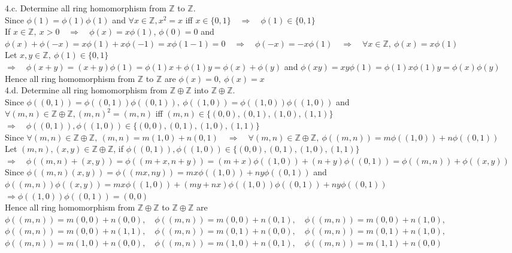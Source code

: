 \documentclass[12pt]{book}
\begin{document}
\begin{CJK}{UTF8}{bsmi}
4.c. Determine all ring homomorphism from $\mathbb{Z}$ to $\mathbb{Z}$. \\
Since $\phi(1)=\phi(1)\phi(1)$ and $\forall x\in\mathbb{Z}, x^2=x$ iff $x\in\{0, 1\}\quad\Rightarrow\quad\phi(1)\in\{0, 1\}$ \\
If $x\in\mathbb{Z},\ x>0\quad\Rightarrow\quad\phi(x)=x\phi(1)$, $\phi(0)=0$ and \\
$\phi(x)+\phi(-x)=x\phi(1)+x\phi(-1)=x\phi(1-1)=0\quad\Rightarrow\quad\phi(-x)=-x\phi(1)\quad\Rightarrow\quad\forall x\in\mathbb{Z},\ \phi(x)=x\phi(1)$ \\
Let $x, y\in\mathbb{Z},\ \phi(1)\in\{0, 1\}$ \\
$\Rightarrow\quad\phi(x+y)=(x+y)\phi(1)=\phi(1)x+\phi(1)y=\phi(x)+\phi(y)$ and $\phi(xy)=xy\phi(1)=\phi(1)x\phi(1)y=\phi(x)\phi(y)$ \\
Hence all ring homomorphism from $\mathbb{Z}$ to $\mathbb{Z}$ are $\phi(x)=0,\ \phi(x)=x$ \\

4.d. Determine all ring homomorphism from $\mathbb{Z}\oplus\mathbb{Z}$ into $\mathbb{Z}\oplus\mathbb{Z}$. \\
Since $\phi((0, 1))=\phi((0, 1))\phi((0, 1)),\ \phi((1, 0))=\phi((1, 0))\phi((1, 0))$ and \\
$\forall (m, n)\in\mathbb{Z}\oplus\mathbb{Z}, (m, n)^2=(m, n)$ iff $(m, n)\in\{(0, 0), (0, 1), (1, 0), (1, 1)\}$ \\
$\Rightarrow\quad\phi((0, 1)), \phi((1, 0))\in\{(0, 0), (0, 1), (1, 0), (1, 1)\}$ \\
Since $\forall (m, n)\in\mathbb{Z}\oplus\mathbb{Z},\ (m, n)=m(1, 0)+n(0, 1)\quad\Rightarrow\quad\forall (m, n)\in\mathbb{Z}\oplus\mathbb{Z},\ \phi((m, n))=m\phi((1, 0))+n\phi((0, 1))$ \\
Let $(m, n), (x, y)\in\mathbb{Z}\oplus\mathbb{Z}$, if $\phi((0, 1)), \phi((1, 0))\in\{(0, 0), (0, 1), (1, 0), (1, 1)\}$ \\
$\Rightarrow\quad\phi((m, n)+(x, y))=\phi((m+x, n+y))=(m+x)\phi((1, 0))+(n+y)\phi((0, 1))=\phi((m, n))+\phi((x, y))$ \\
Since $\phi((m, n)(x, y))=\phi((mx, ny))=mx\phi((1, 0))+ny\phi((0, 1))$ and \\
$\phi((m, n))\phi((x, y))=mx\phi((1, 0))+(my+nx)\phi((1, 0))\phi((0, 1))+ny\phi((0, 1))$ \\
$\Rightarrow\phi((1, 0))\phi((0, 1))=(0, 0)$ \\
Hence all ring homomorphism from $\mathbb{Z}\oplus\mathbb{Z}$ to $\mathbb{Z}\oplus\mathbb{Z}$ are \\
$\phi((m, n))=m(0, 0)+n(0, 0),\quad\phi((m, n))=m(0, 0)+n(0, 1),\quad\phi((m, n))=m(0, 0)+n(1, 0),$ \\
$\phi((m, n))=m(0, 0)+n(1, 1),\quad\phi((m, n))=m(0, 1)+n(0, 0),\quad\phi((m, n))=m(0, 1)+n(1, 0),$ \\
$\phi((m, n))=m(1, 0)+n(0, 0),\quad\phi((m, n))=m(1, 0)+n(0, 1),\quad\phi((m, n))=m(1, 1)+n(0, 0)$ \\


\end{CJK}
\end{document}
